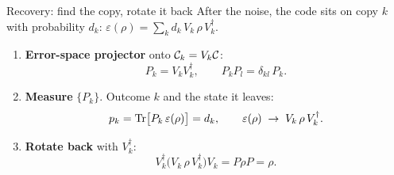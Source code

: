 \begin{frame}{Recovery: find the copy, rotate it back}
  After the noise, the code sits on copy $k$ with probability $d_k$:
  \(
    \varepsilon(\rho) = \sum_k d_k\, V_k\,\rho\,V_k^{\dagger} .
  \)

  \medskip
  \begin{enumerate}
    \item \textbf{Error-space projector} onto $\mathcal{C}_k = V_k\mathcal{C}$:
      \[
        P_k = V_kV_k^{\dagger}, \qquad P_kP_l = \delta_{kl}\,P_k .
      \]
    \item \textbf{Measure} $\{P_k\}$. Outcome $k$ and the state it leaves:
      \[
        p_k = \operatorname{Tr}\!\big[P_k\,\varepsilon(\rho)\big] = d_k ,
        \qquad \varepsilon(\rho) \;\to\; V_k\,\rho\,V_k^{\dagger} .
      \]
    \item \textbf{Rotate back} with $V_k^{\dagger}$:
      \[
        V_k^{\dagger}\big(V_k\,\rho\,V_k^{\dagger}\big)V_k = P\rho P = \rho .
      \]
  \end{enumerate}


\end{frame}
